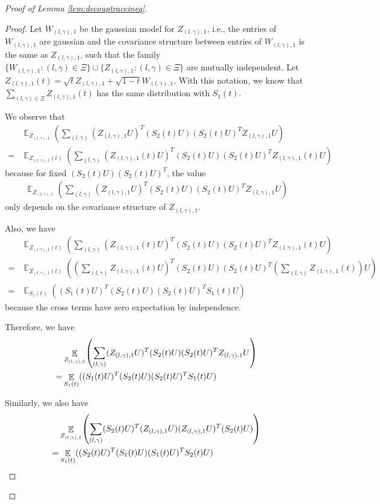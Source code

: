 \documentclass[11pt]{amsart}
\numberwithin{equation}{section}
\numberwithin{equation}{section}
\DeclareMathOperator{\E}{\mathbb{E}}
\DeclarePairedDelimiter{\paren}{(}{)}
\theoremstyle{remark}
\theoremstyle{definition}
\begin{document}
\begin{proof}[Proof of Lemma \ref{lem:decouptraceineq}]
\begin{proof}
Let $W_{(l,\gamma),1}$ be the gaussian model for $Z_{(l,\gamma),1}$, i.e., the entries of $W_{(l,\gamma),1}$ are gaussian and the covariance structure between entries of $W_{(l,\gamma),1}$ is the same as $Z_{(l,\gamma),1}$, such that the family $\{W_{(l,\gamma),1}:(l,\gamma) \in \Xi\} \cup \{Z_{(l,\gamma),1}:(l,\gamma) \in \Xi\}$ are mutually independent. Let $Z_{(l,\gamma),1}(t)=\sqrt{t}Z_{(l,\gamma),1}+\sqrt{1-t}W_{(l,\gamma),1}$. With this notation, we know that $\sum \limits_{(l,\gamma) \in \Xi}Z_{(l,\gamma),1}(t)$ has the same distribution with $S_1(t)$.

We observe that
\begin{align*}
    &\E_{Z_{(l,\gamma),1}}(\sum_{(l,\gamma)}(Z_{(l,\gamma),1}U)^T(S_2(t)U)(S_2(t)U )^TZ_{(l,\gamma),1}U)
    \\=&\E_{Z_{(l,\gamma),1}(t)}(\sum_{(l,\gamma)}(Z_{(l,\gamma),1}(t)U)^T(S_2(t)U)(S_2(t)U )^TZ_{(l,\gamma),1}(t)U)
\end{align*}
because for fixed $(S_2(t)U)(S_2(t)U )^T$, the value
\begin{align*}
    \E_{Z_{(l,\gamma),1}}(\sum_{(l,\gamma)}(Z_{(l,\gamma),1}U)^T(S_2(t)U)(S_2(t)U )^TZ_{(l,\gamma),1}U)
\end{align*}
only depends on the covariance structure of $Z_{(l,\gamma),1}$.

Also, we have
\begin{align*}
    &\E_{Z_{(l,\gamma),1}(t)}(\sum_{(l,\gamma)}(Z_{(l,\gamma),1}(t)U)^T(S_2(t)U)(S_2(t)U )^TZ_{(l,\gamma),1}(t)U)
    \\=&\E_{Z_{(l,\gamma),1}(t)}((\sum_{(l,\gamma)}Z_{(l,\gamma),1}(t)U)^T(S_2(t)U)(S_2(t)U )^T(\sum_{(l,\gamma)}Z_{(l,\gamma),1}(t))U)
    \\=&\E_{S_1(t)}((S_1(t)U)^T(S_2(t)U)(S_2(t)U )^TS_1(t)U)
\end{align*}
because the cross terms have zero expectation by independence.

Therefore, we have
\begin{align*}
    &\E_{Z_{(l,\gamma),1}}\paren*{\sum_{(l,\gamma)}(Z_{(l,\gamma),1}U)^T(S_2(t)U)(S_2(t)U )^TZ_{(l,\gamma),1}U}
    \\=&\E_{S_1(t)}((S_1(t)U)^T(S_2(t)U)(S_2(t)U )^TS_1(t)U)
\end{align*}

Similarly, we also have
\begin{align*}
    &\E_{Z_{(l,\gamma),1}}\paren*{\sum_{(l,\gamma)}(S_2(t)U)^T(Z_{(l,\gamma),1}U)(Z_{(l,\gamma),1}U)^T(S_2(t)U )}\\
    =&\E_{S_1(t)}((S_2(t)U)^T(S_1(t)U)(S_1(t)U )^TS_2(t)U)
\end{align*}


\end{proof}
\end{proof}
\end{document}
